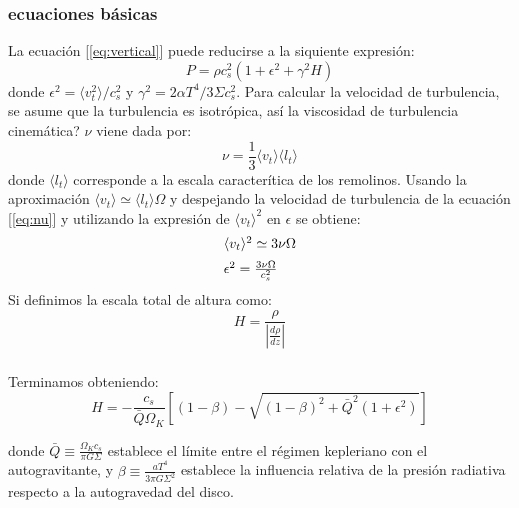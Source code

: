 \documentclass{beamer}
\begin{document}
\begin{frame}
\frametitle{ecuaciones básicas}
\justify
\scriptsize
La ecuación [\ref{eq:vertical}] puede reducirse a la siquiente expresión:
\begin{equation}
 P=\rho c_s^2(1+\epsilon^2+\gamma^2H)
\end{equation}
donde $\epsilon^2= \langle v_t^2\rangle/c_s^2$ y $\gamma^2=2\alpha T^4/3\Sigma c_s^2$.
Para calcular la velocidad de turbulencia, se asume que la turbulencia es isotrópica, así 
la viscosidad de turbulencia cinemática? $\nu$ viene dada por:
\begin{equation}\label{eq:nu}
 \nu = \frac{1}{3}\langle v_t\rangle\langle l_t\rangle
\end{equation}
donde $\langle l_t\rangle$ corresponde a la escala caracterítica de los remolinos.
Usando la aproximación $\langle v_t\rangle \simeq \langle l_t\rangle \Omega$ y despejando
la velocidad de turbulencia de la ecuación [\ref{eq:nu}] y utilizando la
expresión de  $\langle v_t\rangle^2$ en $\epsilon$  se obtiene:
\begin{equation}
\begin{array}{l}
 \vspace*{0.2cm}
 \langle v_t\rangle^2 \simeq 3\nu\Omega \\
 \epsilon^2= \frac{ 3\nu\Omega }{c_s^2}
\end{array}
\end{equation}
Si definimos la escala total de altura como:
\begin{equation}
 H=\frac{\rho}{\left| \frac{d\rho}{dz}\right|}
\end{equation}
\end{frame}



\begin{frame}
\frametitle{}
\justify
\scriptsize
Terminamos obteniendo:
\begin{equation}
H=- \frac{c_s}{\bar{Q}\Omega_K}\left[ (1-\beta) - \sqrt{(1-\beta)^2+\bar{Q}^2(1+\epsilon^2)} \right]  
\end{equation}

donde $\bar{Q} \equiv \frac{\Omega_Kc_s}{\pi G\Sigma}$ establece el límite entre el régimen kepleriano
con el autogravitante, y $\beta \equiv \frac{aT^4}{3\pi G\Sigma^2}$ establece la influencia relativa de
la presión radiativa respecto a la autogravedad del disco.
  

\end{frame}
\end{document}
